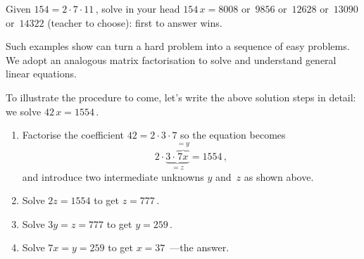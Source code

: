 \begin{activity} \label{eg:}
Given \(154=2\cdot7\cdot11\)\,, solve in your head \(154\,x=8008\) or~\(9856\) or~\(12628\) or~\(13090\) or~\(14322\) (teacher to choose): first to answer wins.
\end{activity}

Such examples show  can turn a hard problem into a sequence of easy problems.  
We adopt an analogous matrix factorisation to solve and understand general linear equations.  

To illustrate the procedure to come, let's write the above solution steps in detail: we solve \(42\,x=1554\)\,.
\begin{enumerate}
\item Factorise the coefficient \(42=2\cdot3\cdot7\) so the equation becomes  
\begin{equation*}
2\cdot\underbrace{3\cdot\overbrace{7x}^{=y}}_{=z}=1554\,,
\end{equation*}
and introduce two intermediate unknowns \(y\) and~\(z\) as shown above.
\item Solve \(2z=1554\) to get \(z=777\)\,.
\item Solve \(3y=z=777\) to get \(y=259\)\,.
\item Solve \(7x=y=259\) to get \(x=37\)\ ---the answer.
\end{enumerate}

